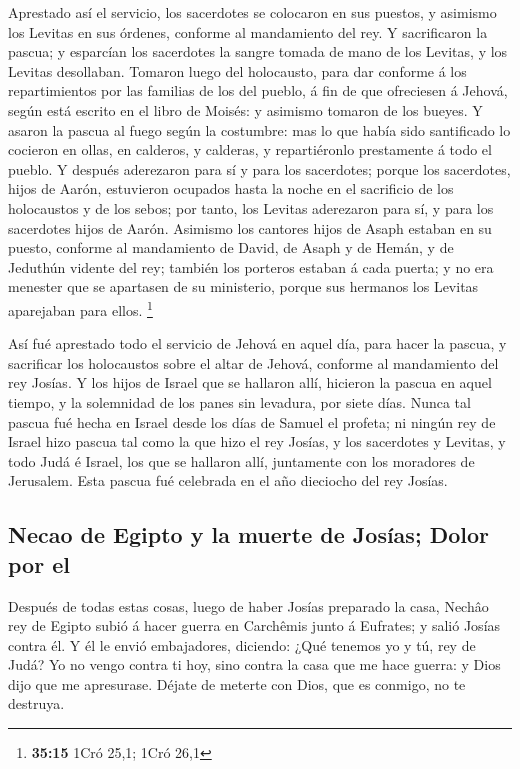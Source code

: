  Aprestado así el servicio, los sacerdotes se colocaron
en sus puestos, y asimismo los Levitas en sus órdenes, conforme al
mandamiento del rey.  Y sacrificaron la pascua; y
esparcían los sacerdotes la sangre tomada de mano de los Levitas, y los
Levitas desollaban.  Tomaron luego del holocausto, para
dar conforme á los repartimientos por las familias de los del pueblo, á
fin de que ofreciesen á Jehová, según está escrito en el libro de
Moisés: y asimismo tomaron de los bueyes.  Y asaron la
pascua al fuego según la costumbre: mas lo que había sido santificado lo
cocieron en ollas, en calderos, y calderas, y repartiéronlo prestamente
á todo el pueblo.  Y después aderezaron para sí y para
los sacerdotes; porque los sacerdotes, hijos de Aarón, estuvieron
ocupados hasta la noche en el sacrificio de los holocaustos y de los
sebos; por tanto, los Levitas aderezaron para sí, y para los sacerdotes
hijos de Aarón.  Asimismo los cantores hijos de Asaph
estaban en su puesto, conforme al mandamiento de David, de Asaph y de
Hemán, y de Jeduthún vidente del rey; también los porteros estaban á
cada puerta; y no era menester que se apartasen de su ministerio, porque
sus hermanos los Levitas aparejaban para ellos. \footnote{\textbf{35:15}
  1Cró 25,1; 1Cró 26,1}

 Así fué aprestado todo el servicio de Jehová en aquel
día, para hacer la pascua, y sacrificar los holocaustos sobre el altar
de Jehová, conforme al mandamiento del rey Josías.  Y los
hijos de Israel que se hallaron allí, hicieron la pascua en aquel
tiempo, y la solemnidad de los panes sin levadura, por siete días.
 Nunca tal pascua fué hecha en Israel desde los días de
Samuel el profeta; ni ningún rey de Israel hizo pascua tal como la que
hizo el rey Josías, y los sacerdotes y Levitas, y todo Judá é Israel,
los que se hallaron allí, juntamente con los moradores de Jerusalem.
 Esta pascua fué celebrada en el año dieciocho del rey
Josías.

\hypertarget{necao-de-egipto-y-la-muerte-de-josuxedas-dolor-por-el}{%
\subsection{Necao de Egipto y la muerte de Josías; Dolor por
el}\label{necao-de-egipto-y-la-muerte-de-josuxedas-dolor-por-el}}

 Después de todas estas cosas, luego de haber Josías
preparado la casa, Nechâo rey de Egipto subió á hacer guerra en
Carchêmis junto á Eufrates; y salió Josías contra él.  Y
él le envió embajadores, diciendo: ¿Qué tenemos yo y tú, rey de Judá? Yo
no vengo contra ti hoy, sino contra la casa que me hace guerra: y Dios
dijo que me apresurase. Déjate de meterte con Dios, que es conmigo, no
te destruya.

